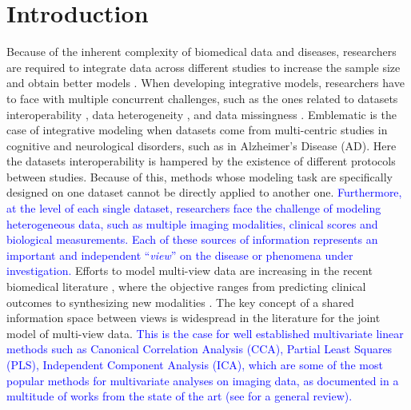 \section{Introduction}

Because of the inherent complexity of biomedical data and diseases,
researchers are required to integrate data across different studies to increase the sample size and obtain better models \citep{LeSueur2020}.
%
When developing integrative models, researchers have to face with multiple concurrent challenges, such as the ones related to
datasets interoperability \citep{Tognin2020},
data heterogeneity \citep{Buch2020},
and data missingness \citep{GolrizKhatami2020}.
%
Emblematic is the case of integrative modeling when datasets come from multi-centric studies in cognitive and neurological disorders,
such as in Alzheimer's Disease (AD).
%
Here the datasets interoperability is hampered by the existence of different protocols between studies.
Because of this, methods whose modeling task are specifically designed on one dataset cannot be directly applied to another one.
\textcolor{blue}{
	Furthermore, at the level of each single dataset, researchers face the challenge of modeling heterogeneous data,
	such as multiple imaging modalities, clinical scores and biological measurements.
	Each of these sources of information represents an important and independent ``\textit{view}'' on the disease or phenomena under investigation.
}
Efforts to model multi-view data are increasing in the recent biomedical literature \citep{Vieira2020,Venugopalan2021},
where the objective ranges from predicting clinical outcomes \citep{Chen2019,AbiNader2020,Tabarestani2020}
to synthesizing new modalities \citep{Zhou2020, Wei2020}.
The key concept of a shared information space between views is widespread in the literature for the joint model of multi-view data.
%
\textcolor{blue}{
This is the case for well established multivariate linear methods such as
Canonical Correlation Analysis (CCA),
Partial Least Squares (PLS),
Independent Component Analysis (ICA),
which are some of the most popular methods for multivariate analyses on imaging data, as documented in a multitude of works from the state of the art (see \cite{Liu2014} for a general review).
}
